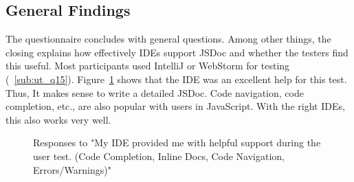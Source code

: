 \subsection{General Findings} %
\label{sub:General Findings}
The questionnaire concludes with general questions. Among other things, the
closing explains how effectively IDEs support JSDoc and whether the testers
find this useful. Most participants used IntelliJ or WebStorm for testing
(~\ref{sub:ut_q15}). Figure~\ref{fig:usertest_q3} shows that the IDE was an excellent help for this test. Thus, It
makes sense to write a detailed JSDoc. Code navigation, code completion, etc.,
are also popular with users in JavaScript. With the right IDEs, this also works
very well.
\begin{figure}[H]
\caption{Responses to "My IDE provided me with helpful support during the user
test. (Code Completion, Inline Docs, Code Navigation, Errors/Warnings)"}
\label{fig:usertest_q3}
\end{figure}
